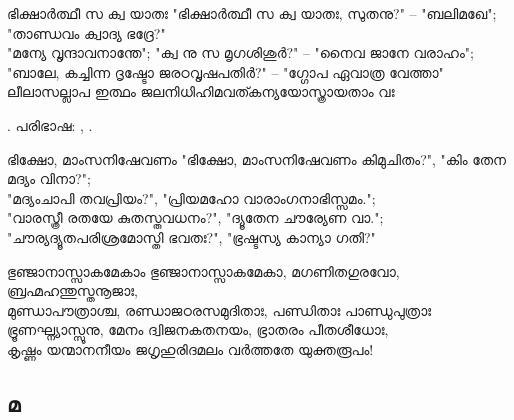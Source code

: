 \begin{enumerate}



\begin{slokam}{\VSr}{\Unk}{ഭിക്ഷാർത്ഥീ സ ക്വ യാതഃ}
"ഭിക്ഷാർത്ഥീ സ ക്വ യാതഃ, സുതനു?" -- "ബലിമഖേ"; "താണ്ഡവം ക്വാദ്യ ഭദ്രേ?"\\
"മന്യേ വൃന്ദാവനാന്തേ"; "ക്വ നു സ മൃഗശിശുർ?" -- "നൈവ ജാനേ വരാഹം";\\
"ബാലേ, കച്ചിന്ന ദൃഷ്ടോ ജരഠവൃഷപതിർ?" -- "ഗ്ഗോപ ഏവാത്ര വേത്താ"\\
ലീലാസല്ലാപ ഇത്ഥം ജലനിധിഹിമവത്കന്യയോസ്ത്രായതാം വഃ
\end{slokam}


.  പരിഭാഷ:  , .

\begin{slokam}{\VSv}{\KD}{ഭിക്ഷോ, മാംസനിഷേവണം}
 "ഭിക്ഷോ, മാംസനിഷേവണം കിമുചിതം?", "കിം തേന മദ്യം വിനാ?";\\
"മദ്യംചാപി തവപ്രിയം?", "പ്രിയമഹോ വാരാംഗനാഭിസ്സമം.";\\
"വാരസ്ത്രീ രതയേ കുതസ്തവധനം?", "ദ്യൂതേന ചൗര്യേണ വാ.";\\
"ചൗര്യദ്യൂതപരിശ്രമോസ്തി ഭവതഃ?", "ഭ്രഷ്ടസ്യ കാന്യാ ഗതി?"
\end{slokam}


\begin{slokam}{\VSr}{\Melp}{ഭുഞ്ജാനാസ്സാകമേകാം}
 ഭുഞ്ജാനാസ്സാകമേകാ, മഗണിതഗുരവോ, ബ്രഹ്മഹന്തുസ്തനൂജാഃ,\\
മുണ്ഡാപൗത്രാശ്ച, രണ്ഡാജഠരസമുദിതാഃ, പണ്ഡിതാഃ പാണ്ഡുപുത്രാഃ\\
ഭ്രൂണഘ്ന്യാസ്സൂനു, മേനം ദ്വിജനകതനയം, ഭ്രാതരം പീതശീധോഃ,\\
കൃഷ്ണം യന്മാനനീയം ജഗൃഹുരിദമലം വർത്തതേ യുക്തരൂപം!
\end{slokam}




\end{enumerate}

\subsection{മ}

